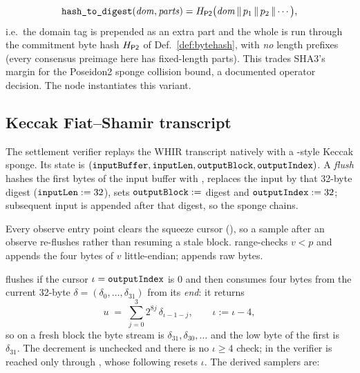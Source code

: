 \begin{definition}
\[
  \texttt{hash\_to\_digest}(\mathit{dom},\mathit{parts}) = H_{\mathsf{P2}}\big(\mathit{dom} \,\|\, p_1 \,\|\, p_2 \,\|\cdots\big),
\]
i.e.\ the domain tag is prepended as an extra part and the whole is run through the
commitment byte hash $H_{\mathsf{P2}}$ of Def.~\ref{def:bytehash}, with \emph{no} length prefixes
(every consensus preimage here has fixed-length parts).
This trades SHA3's margin for the Poseidon2 sponge collision bound, a documented
operator decision. The node instantiates this variant.
\end{definition}

\subsection{Keccak Fiat--Shamir transcript}

The settlement verifier replays the WHIR transcript natively with a
-style Keccak sponge. Its state is
$(\texttt{inputBuffer}, \texttt{inputLen}, \texttt{outputBlock}, \texttt{outputIndex})$.
A \emph{flush} hashes the first  bytes of the input buffer with
, replaces the input by that 32-byte digest
($\texttt{inputLen} := 32$), sets $\texttt{outputBlock} := $ digest and
$\texttt{outputIndex} := 32$; subsequent input is appended after that digest, so the
sponge chains.

\begin{definition}[Observe]
Every observe entry point clears the squeeze cursor (), so a
sample after an observe re-flushes rather than resuming a stale block.
 range-checks $v<p$ and appends the four bytes of $v$
little-endian;  appends raw bytes.
\end{definition}

\begin{definition}[Sample]
 flushes if the cursor $\iota = \texttt{outputIndex}$ is $0$ and
then consumes four bytes from the current 32-byte 
$\delta = (\delta_0,\dots,\delta_{31})$ from its \emph{end}: it returns
\[
  u \;=\; \sum_{j=0}^{3} 2^{8j}\,\delta_{\iota-1-j}, \qquad \iota := \iota - 4,
\]
so on a fresh block the byte stream is $\delta_{31},\delta_{30},\dots$ and the low
byte of the first  is $\delta_{31}$.
The decrement is unchecked and there is no $\iota \ge 4$ check; in the verifier
 is reached only through , whose following
 resets $\iota$.
The derived samplers are:
\end{definition}

